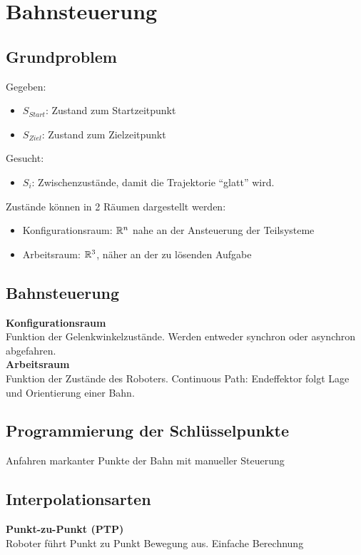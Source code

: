 

\section{Bahnsteuerung}

\subsection{Grundproblem}
Gegeben:
\begin{itemize}
\item \(S_{\mathit{Start}}\): Zustand zum Startzeitpunkt
\item \(S_{\mathit{Ziel}}\): Zustand zum Zielzeitpunkt
\end{itemize}
Gesucht:
\begin{itemize}
\item \(S_i\): Zwischenzustände, damit die Trajektorie \enquote{glatt} wird.
\end{itemize}

Zustände können in 2 Räumen dargestellt werden:
\begin{itemize}
\item Konfigurationsraum: \(\mathbb{R}^n\) nahe an der Ansteuerung der Teilsysteme
\item Arbeitsraum: \(\mathbb{R}^3\), \SE{} näher an der zu lösenden Aufgabe
\end{itemize}


\subsection{Bahnsteuerung}
\textbf{Konfigurationsraum}\\
Funktion der Gelenkwinkelzustände. Werden entweder synchron oder asynchron abgefahren.\\

\textbf{Arbeitsraum}\\
Funktion der Zustände des Roboters. Continuous Path: Endeffektor folgt Lage und Orientierung einer Bahn.\\


\subsection{Programmierung der Schlüsselpunkte}
Anfahren markanter Punkte der Bahn mit manueller Steuerung

\subsection{Interpolationsarten}
\textbf{Punkt-zu-Punkt (PTP)}\\
Roboter führt Punkt zu Punkt Bewegung aus. Einfache Berechnung\\

